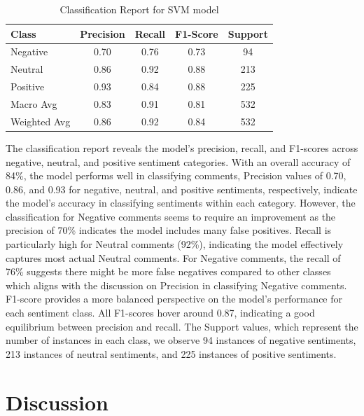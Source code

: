 \documentclass[11pt,article,oneside]{article}
\begin{document}
\begin{table}[h]
\centering
\caption{Classification Report for SVM model}
\label{tab:classification_report}
\begin{tabular}{p{3cm}cccc}
\toprule
\textbf{Class} & \textbf{Precision} & \textbf{Recall} & \textbf{F1-Score} & \textbf{Support} \\
\midrule
Negative & 0.70 & 0.76 & 0.73 & 94 \\
Neutral & 0.86 & 0.92 & 0.88 & 213 \\
Positive & 0.93 & 0.84 & 0.88 & 225 \\
\midrule
Macro Avg & 0.83 & 0.91 & 0.81 & 532 \\
Weighted Avg & 0.86 & 0.92 & 0.84 & 532 \\
\bottomrule
\end{tabular}
\end{table}

The classification report reveals the model's precision, recall, and F1-scores across negative, neutral, and positive sentiment categories. With an overall accuracy of 84\%, the model performs well in classifying comments,  Precision values of 0.70, 0.86, and 0.93 for negative, neutral, and positive sentiments, respectively, indicate the model's accuracy in classifying sentiments within each category. However, the classification for Negative comments seems to require an improvement as the precision of 70\% indicates the model includes many false positives. Recall is particularly high for Neutral comments (92\%), indicating the model effectively captures most actual Neutral comments. For Negative comments,  the recall of 76\% suggests there might be more false negatives compared to other classes which aligns with the discussion on Precision in classifying Negative comments. F1-score provides a more balanced perspective on the model's performance for each sentiment class. All F1-scores hover around 0.87, indicating a good equilibrium between precision and recall. The Support values, which represent the number of instances in each class, we observe 94 instances of negative sentiments, 213 instances of neutral sentiments, and 225 instances of positive sentiments.

\section{Discussion}
\end{document}
